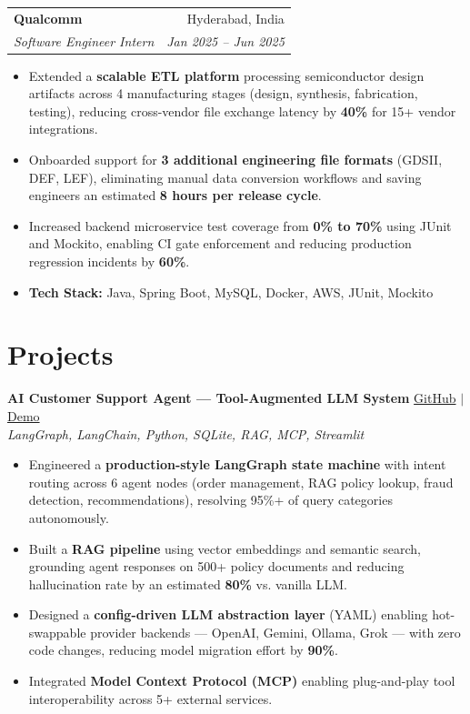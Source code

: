 \documentclass[a4paper,20pt]{article}
\makeatletter
\newcommand{\resumeSubheading}[4]{
\begin{tabular*}{0.97\textwidth}{l@{\extracolsep{\fill}}r}
\textbf{#1} & #2 \\
\textit{#3} & \textit{#4} \\
\end{tabular*}\vspace{-6pt}
}
\newcommand{\resumeItem}[1]{
\item\small{#1}
}
\makeatother
\begin{document}
\vspace{2pt}

\resumeSubheading
{Qualcomm}{Hyderabad, India}
{Software Engineer Intern}{Jan 2025 -- Jun 2025}

\begin{itemize}[leftmargin=*, itemsep=-2pt]

\resumeItem{Extended a \textbf{scalable ETL platform} processing semiconductor design artifacts across 4 manufacturing stages (design, synthesis, fabrication, testing), reducing cross-vendor file exchange latency by \textbf{40\%} for 15+ vendor integrations.}

\resumeItem{Onboarded support for \textbf{3 additional engineering file formats} (GDSII, DEF, LEF), eliminating manual data conversion workflows and saving engineers an estimated \textbf{8 hours per release cycle}.}

\resumeItem{Increased backend microservice test coverage from \textbf{0\% to 70\%} using JUnit and Mockito, enabling CI gate enforcement and reducing production regression incidents by \textbf{60\%}.}

\resumeItem{\textbf{Tech Stack:} Java, Spring Boot, MySQL, Docker, AWS, JUnit, Mockito}

\end{itemize}


\section{Projects}

\textbf{AI Customer Support Agent — Tool-Augmented LLM System}
\hfill \href{https://github.com/BoorlaKarthikeya/E-commerce_CustomerAgent_with_tools}{GitHub} $|$
\href{https://www.linkedin.com/posts/boorla-karthikeya_aiengineering-llm-agentsystems-activity-7433823933877096448-Lrur}{Demo} \\
\textit{LangGraph, LangChain, Python, SQLite, RAG, MCP, Streamlit}
\begin{itemize}[leftmargin=*, itemsep=-2pt]
\resumeItem{Engineered a \textbf{production-style LangGraph state machine} with intent routing across 6 agent nodes (order management, RAG policy lookup, fraud detection, recommendations), resolving 95\%+ of query categories autonomously.}
\resumeItem{Built a \textbf{RAG pipeline} using vector embeddings and semantic search, grounding agent responses on 500+ policy documents and reducing hallucination rate by an estimated \textbf{80\%} vs. vanilla LLM.}
\resumeItem{Designed a \textbf{config-driven LLM abstraction layer} (YAML) enabling hot-swappable provider backends — OpenAI, Gemini, Ollama, Grok — with zero code changes, reducing model migration effort by \textbf{90\%}.}
\resumeItem{Integrated \textbf{Model Context Protocol (MCP)} enabling plug-and-play tool interoperability across 5+ external services.}
\end{itemize}
\end{document}
